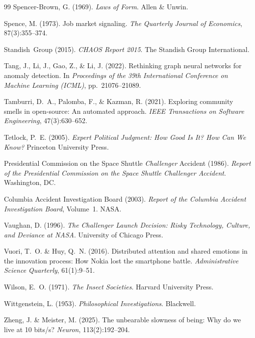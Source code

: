 \documentclass[11pt,a4paper]{article}
\begin{document}
\begin{thebibliography}{99}
Spencer-Brown, G. (1969).
\newblock \emph{Laws of Form}.
\newblock Allen \& Unwin.

Spence, M. (1973).
\newblock Job market signaling.
\newblock \emph{The Quarterly Journal of Economics}, 87(3):355--374.

Standish~Group (2015).
\newblock \emph{CHAOS Report 2015}.
\newblock The Standish Group International.

Tang, J., Li, J., Gao, Z., \& Li, J. (2022).
\newblock Rethinking graph neural networks for anomaly detection.
\newblock In \emph{Proceedings of the 39th International Conference on Machine Learning (ICML)}, pp.~21076--21089.

Tamburri, D.~A., Palomba, F., \& Kazman, R. (2021).
\newblock Exploring community smells in open-source: An automated approach.
\newblock \emph{IEEE Transactions on Software Engineering}, 47(3):630--652.

Tetlock, P.~E. (2005).
\newblock \emph{Expert Political Judgment: How Good Is It? How Can We Know?}
\newblock Princeton University Press.

Presidential Commission on the Space Shuttle \emph{Challenger} Accident (1986).
\newblock \emph{Report of the Presidential Commission on the Space Shuttle Challenger Accident}.
\newblock Washington, DC.

Columbia Accident Investigation Board (2003).
\newblock \emph{Report of the Columbia Accident Investigation Board}, Volume~1.
\newblock NASA.

Vaughan, D. (1996).
\newblock \emph{The Challenger Launch Decision: Risky Technology, Culture, and Deviance at NASA}.
\newblock University of Chicago Press.

Vuori, T.~O. \& Huy, Q.~N. (2016).
\newblock Distributed attention and shared emotions in the innovation process: How {N}okia lost the smartphone battle.
\newblock \emph{Administrative Science Quarterly}, 61(1):9--51.

Wilson, E.~O. (1971).
\newblock \emph{The Insect Societies}.
\newblock Harvard University Press.

Wittgenstein, L. (1953).
\newblock \emph{Philosophical Investigations}.
\newblock Blackwell.

Zheng, J. \& Meister, M. (2025).
\newblock The unbearable slowness of being: Why do we live at 10 bits/s?
\newblock \emph{Neuron}, 113(2):192--204.

\end{thebibliography}
\end{document}
